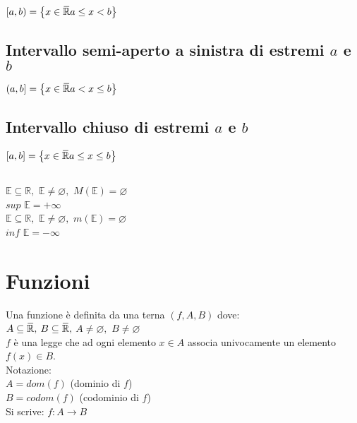 \documentclass[a4paper, twoside, italian, 11pt]{book}
\newcommand{\braces}[1] {\left\{#1\right\}}
\newcommand{\overbar}[1]{\mkern 1.5mu\overline{\mkern-1.5mu#1\mkern-1.5mu}\mkern 1.5mu}
\newcommand{\R}{\mathbb{R}}
\newcommand{\E}{\mathbb{E}}
\let\emptyset\varnothing
\begin{document}
\noindent
$[a, b) = \braces{ x \in \overbar \R a \leq x < b}$ \\


\subsection{Intervallo semi-aperto a sinistra di estremi $a$ e $b$}

\noindent
$(a, b] = \braces{ x \in \overbar \R a < x \leq b}$ \\


\subsection{Intervallo chiuso di estremi $a$ e $b$}

\noindent
$[a, b] = \braces{ x \in \overbar \R a \leq x \leq b}$ \\


\subsection{}

\noindent
$\E \subseteq \R,$ $\E \neq \emptyset,$ $M(\E) = \emptyset$ \\
$sup$ $\E = +\infty$ \\

\noindent
$\E \subseteq \R,$ $\E \neq \emptyset,$ $m(\E) = \emptyset$ \\
$inf$ $\E = -\infty$



\section{Funzioni}

\noindent
Una funzione è definita da una terna $(f, A, B)$ dove: \\

\noindent
$A \subseteq \overbar \R,$ $B \subseteq \overbar \R,$ $A \neq \emptyset,$ $B \neq \emptyset$ \\
$f$ è una legge che ad ogni elemento $x \in A$ associa univocamente un elemento $f(x) \in B$. \\

\noindent
Notazione: \\
$A = dom(f)$ (dominio di $f$) \\
$B = codom(f)$ (codominio di $f$) \\

\noindent
Si scrive: $f : A \rightarrow B$ \\
\end{document}
